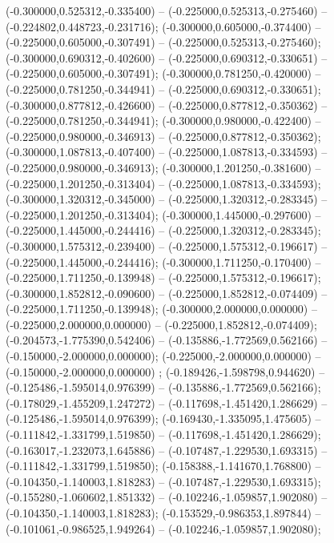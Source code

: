  (-0.300000,0.525312,-0.335400) -- (-0.225000,0.525313,-0.275460) -- (-0.224802,0.448723,-0.231716);
 (-0.300000,0.605000,-0.374400) -- (-0.225000,0.605000,-0.307491) -- (-0.225000,0.525313,-0.275460);
 (-0.300000,0.690312,-0.402600) -- (-0.225000,0.690312,-0.330651) -- (-0.225000,0.605000,-0.307491);
 (-0.300000,0.781250,-0.420000) -- (-0.225000,0.781250,-0.344941) -- (-0.225000,0.690312,-0.330651);
 (-0.300000,0.877812,-0.426600) -- (-0.225000,0.877812,-0.350362) -- (-0.225000,0.781250,-0.344941);
 (-0.300000,0.980000,-0.422400) -- (-0.225000,0.980000,-0.346913) -- (-0.225000,0.877812,-0.350362);
 (-0.300000,1.087813,-0.407400) -- (-0.225000,1.087813,-0.334593) -- (-0.225000,0.980000,-0.346913);
 (-0.300000,1.201250,-0.381600) -- (-0.225000,1.201250,-0.313404) -- (-0.225000,1.087813,-0.334593);
 (-0.300000,1.320312,-0.345000) -- (-0.225000,1.320312,-0.283345) -- (-0.225000,1.201250,-0.313404);
 (-0.300000,1.445000,-0.297600) -- (-0.225000,1.445000,-0.244416) -- (-0.225000,1.320312,-0.283345);
 (-0.300000,1.575312,-0.239400) -- (-0.225000,1.575312,-0.196617) -- (-0.225000,1.445000,-0.244416);
 (-0.300000,1.711250,-0.170400) -- (-0.225000,1.711250,-0.139948) -- (-0.225000,1.575312,-0.196617);
 (-0.300000,1.852812,-0.090600) -- (-0.225000,1.852812,-0.074409) -- (-0.225000,1.711250,-0.139948);
 (-0.300000,2.000000,0.000000) -- (-0.225000,2.000000,0.000000) -- (-0.225000,1.852812,-0.074409);
 (-0.204573,-1.775390,0.542406) -- (-0.135886,-1.772569,0.562166) -- (-0.150000,-2.000000,0.000000);
 (-0.225000,-2.000000,0.000000) -- (-0.150000,-2.000000,0.000000) ;
 (-0.189426,-1.598798,0.944620) -- (-0.125486,-1.595014,0.976399) -- (-0.135886,-1.772569,0.562166);
 (-0.178029,-1.455209,1.247272) -- (-0.117698,-1.451420,1.286629) -- (-0.125486,-1.595014,0.976399);
 (-0.169430,-1.335095,1.475605) -- (-0.111842,-1.331799,1.519850) -- (-0.117698,-1.451420,1.286629);
 (-0.163017,-1.232073,1.645886) -- (-0.107487,-1.229530,1.693315) -- (-0.111842,-1.331799,1.519850);
 (-0.158388,-1.141670,1.768800) -- (-0.104350,-1.140003,1.818283) -- (-0.107487,-1.229530,1.693315);
 (-0.155280,-1.060602,1.851332) -- (-0.102246,-1.059857,1.902080) -- (-0.104350,-1.140003,1.818283);
 (-0.153529,-0.986353,1.897844) -- (-0.101061,-0.986525,1.949264) -- (-0.102246,-1.059857,1.902080);
